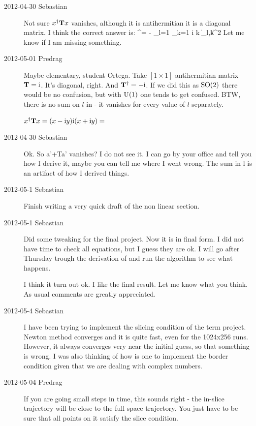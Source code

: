 \begin{description}
\item[2012-04-30 Sebastian]
Not sure $x^\dagger \mathbf{T} x$ vanishes, although it is antihermitian
it is a diagonal matrix. I think the correct answer is:
\beq
\ssp^\dagger \Lg \ssp = - \sum_{l=1} \sum_{k=1} i k \| \ssp_{l,k}\|^2
Let me know if I am missing something.

\item[2012-05-01 Predrag]
Maybe elementary, student Ortega. Take $[1\!\times\!1]$ antihermitian matrix $\mathbf{T} = \mathrm{i}$.
It's diagonal, right. And  $\mathbf{T}^\dagger = - \mathrm{i}$. If we did this as $\textrm{SO}(2)$ there would be
no confusion, but with $\textrm{U}(1)$ one tends to get confused. BTW, there is no sum on $l$ in
 - it vanishes for every value of $l$ separately.

$x^\dagger \mathbf{T} x= (x-\mathrm{i} y)\mathrm{i} (x+\mathrm{i} y) = $

\item[2012-04-30 Sebastian]
Ok. So a'+Ta' vanishes? I do not see it. I can go by your office and tell
you how I derive it, maybe you can tell me where I went wrong. The sum in
l is an artifact of how I derived things.

\item[2012-05-1 Sebastian]
Finish writing a very quick draft of the non linear section.

\item[2012-05-1 Sebastian]
Did some tweaking for the final project. Now it is in final form. I did
not have time to check all equations, but I guess they are ok. I will go
after Thursday trough the derivation of  and run the
algorithm to see what happens.

I think it turn out ok. I like the final result. Let me know what you
think. As usual comments are greatly appreciated.

\item[2012-05-4 Sebastian]
I have been trying to implement the slicing condition of the term
project. Newton method converges and it is quite fast, even for the
1024x256 runs. However, it always converges very near the initial guess,
so that something is wrong. I was also thinking of how is one to
implement the border condition given that we are dealing with complex
numbers.

\item[2012-05-04 Predrag] If you are going small steps in time, this
sounds right - the in-slice trajectory will be close to the full space
trajectory. You just have to be sure that all points on it satisfy the
slice condition.


\end{description}
